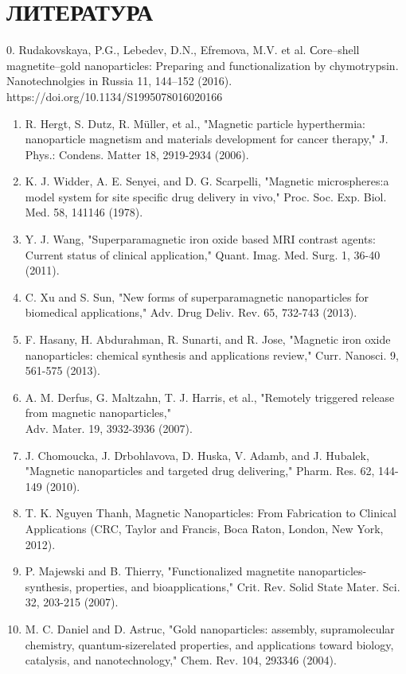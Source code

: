 \documentclass[10pt, a4paper]{article}
\begin{document}
\section*{ЛИТЕРАТУРА}
0. Rudakovskaya, P.G., Lebedev, D.N., Efremova, M.V. et al. Сore–shell magnetite–gold nanoparticles: Preparing and functionalization by chymotrypsin. \\
Nanotechnolgies in Russia 11, 144–152 (2016). https://doi.org/10.1134/S1995078016020166
\begin{enumerate}
  \item R. Hergt, S. Dutz, R. Müller, et al., "Magnetic particle hyperthermia: nanoparticle magnetism and materials development for cancer therapy," J. Phys.: Condens. Matter 18, 2919-2934 (2006).
  \item K. J. Widder, A. E. Senyei, and D. G. Scarpelli, "Magnetic microspheres:a model system for site specific drug delivery in vivo," Proc. Soc. Exp. Biol. Med. 58, 141146 (1978).
  \item Y. J. Wang, "Superparamagnetic iron oxide based MRI contrast agents: Current status of clinical application," Quant. Imag. Med. Surg. 1, 36-40 (2011).
  \item C. Xu and S. Sun, "New forms of superparamagnetic nanoparticles for biomedical applications," Adv. Drug Deliv. Rev. 65, 732-743 (2013).
  \item F. Hasany, H. Abdurahman, R. Sunarti, and R. Jose, "Magnetic iron oxide nanoparticles: chemical synthesis and applications review," Curr. Nanosci. 9, 561-575 (2013).
  \item A. M. Derfus, G. Maltzahn, T. J. Harris, et al., "Remotely triggered release from magnetic nanoparticles," \\
  Adv. Mater. 19, 3932-3936 (2007).
  \item J. Chomoucka, J. Drbohlavova, D. Huska, V. Adamb, and J. Hubalek, "Magnetic nanoparticles and targeted drug delivering," Pharm. Res. 62, 144-149 (2010).
  \item T. K. Nguyen Thanh, Magnetic Nanoparticles: From Fabrication to Clinical Applications (CRC, Taylor and Francis, Boca Raton, London, New York, 2012).
  \item P. Majewski and B. Thierry, "Functionalized magnetite nanoparticles-synthesis, properties, and bioapplications," Crit. Rev. Solid State Mater. Sci. 32, 203-215 (2007).
  \item M. C. Daniel and D. Astruc, "Gold nanoparticles: assembly, supramolecular chemistry, quantum-sizerelated properties, and applications toward biology, catalysis, and nanotechnology," Chem. Rev. 104, 293346 (2004).

\end{enumerate}
\end{document}
